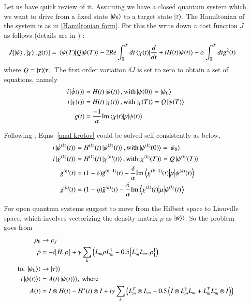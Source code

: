 Let us have quick review of it. Assuming we have a closed quantum system which we want to drive from a fixed state $ \ket{\psi _{0}}$ to a target state $ \ket{\tau} $. The Hamiltonian of the system is as in \eqref{Hamiltonian form}.
For this the write down a cost function $J$ as follows (details are in  \cite{2018EPJST.227..203S}) :
\begin{align}\label{cost_function}
    J[\ket{\psi}, \ket{\chi}, g(t)] &= \expval{Q}{\psi(T)} - 2Re\int_{0}^{T}dt \matrixelement{\chi(t)}{\dv{}{t} +  iH(t)}{\psi(t)}  - \alpha \int_{0}^{T}dt g^{2}(t)
\end{align}
where $ Q = \dyad{\tau}$. The first order variation $δJ$ is set to zero to obtain a set of equations, namely
\begin{align}\label{anal-krotov}
    i\ket{\dot{\psi}(t)} &=  H(t)\ket{\psi(t)},\text{with} \ket{\psi(0)} = \ket{\psi_{0}}\\
    i\ket{\dot{\chi}(t)} &= H(t)\ket{\chi(t)},\text{with} \ket{\chi(T)} = Q\ket{\psi(T)}\\
    g(t) &= \frac{-1}{\alpha}\text{Im}\matrixelement{\chi(t)}{\mu}{\psi(t)}
\end{align}


Following \cite{2012JChPh.136j4103R},   Eqns. \eqref{anal-krotov} could be solved self-consistently  as below,
\begin{align}\label{ansatz_krotov}
    i\ket{\dot{\psi}^{(k)}(t)} &=  H^{(k)}(t) \ket{\psi^{(k)}(t)},\text{with} \ket{\psi^{(k)}(0)} = \ket{\psi_{0}}\\
    i\ket{\dot{\chi}^{(k)}(t)} &= H^{(k)}(t) \ket{\chi^{(k)}(t)},\text{with} \ket{\chi^{(k)}(T)} = Q\ket{\psi^{(k)}(T)}\\
    g^{(k)}(t) &= (1 - \delta)\tilde{g}^{(k-1)}(t) -  \dfrac{\delta}{\alpha}\text{Im}\matrixelement{\chi^{(k-1)}(t)}{\mu}{\psi^{(k)}(t)}\\
    g^{(k)}(t) &= (1 - \eta)\tilde{g}^{(k)}(t) -  \dfrac{\delta}{\alpha}\text{Im}\matrixelement{\chi^{(k)}(t)}{\mu}{\psi^{(k)}(t)}
\end{align}

For open quantum systems \cite{2018EPJST.227..203S} suggest to move from the Hilbert space to Liouville space, which involves vectorizing the density matrix $\rho$ as $\ket{\psi}\rangle$. So the problem goes from 
 \begin{align}\label{Hilbert_liou:1}
     \rho_{0} &\rightarrow \rho_{f}\\
     \dot{\rho} &= - i\comm{H}{\rho} + \gamma\sum_{k} \left(L_{m} \rho L_{m}^{\dagger} - 0.5 \anticommutator{L_{m}^{\dagger}L_{m}}{ \rho}\right)\\
\text{to, }   
    \ket{\psi_{0}}\rangle &\rightarrow \ket{\tau}\rangle\\
    i\ket{\dot{\psi}(t)}\rangle &= A(t)\ket{\psi(t)}\rangle,  \text{ where}\\
    A(t) &= I\otimes H(t) - H^{*}(t)\otimes I + i\gamma\sum_{k} \left(
    L_{m}^{T}\otimes L_{m} - 0.5\left( I \otimes L_{m}^{\dagger} L_{m} + L_{m}^{T} L_{m}^{*} \otimes I\right)\right)
\end{align}

